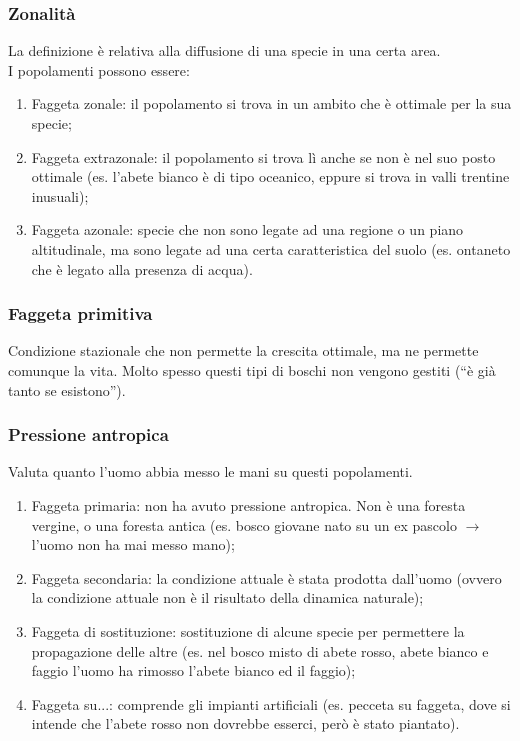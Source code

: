 \subsubsection{Zonalità}
La definizione è relativa alla diffusione di una specie in una certa area.\\
I popolamenti possono essere:
\begin{enumerate}[nosep]
    \item Faggeta zonale: il popolamento si trova in un ambito che è ottimale per la sua specie;
    \item Faggeta extrazonale: il popolamento si trova lì anche se non è nel suo posto ottimale (es. l'abete bianco è di tipo oceanico, eppure si trova in valli trentine inusuali);
    \item Faggeta azonale: specie che non sono legate ad una regione o un piano altitudinale, ma sono legate ad una certa caratteristica del suolo (es. ontaneto che è legato alla presenza di acqua). 
\end{enumerate}
\subsubsection{Faggeta primitiva} Condizione stazionale che non permette la crescita ottimale, ma ne permette comunque la vita. Molto spesso questi tipi di boschi non vengono gestiti (``è già tanto se esistono'').
\subsubsection{Pressione antropica}
Valuta quanto l'uomo abbia messo le mani su questi popolamenti.
\begin{enumerate}[nosep]
    \item Faggeta primaria: non ha avuto pressione antropica. Non è una foresta vergine, o una foresta antica (es. bosco giovane nato su un ex pascolo $\rightarrow$ l'uomo non ha mai messo mano);
    \item Faggeta secondaria: la condizione attuale è stata prodotta dall'uomo (ovvero la condizione attuale non è il risultato della dinamica naturale);
    \item Faggeta di sostituzione: sostituzione di alcune specie per permettere la propagazione delle altre (es. nel bosco misto di abete rosso, abete bianco e faggio l'uomo ha rimosso l'abete bianco ed il faggio);
    \item Faggeta su...: comprende gli impianti artificiali (es. pecceta su faggeta, dove si intende che l'abete rosso non dovrebbe esserci, però è stato piantato).
\end{enumerate}